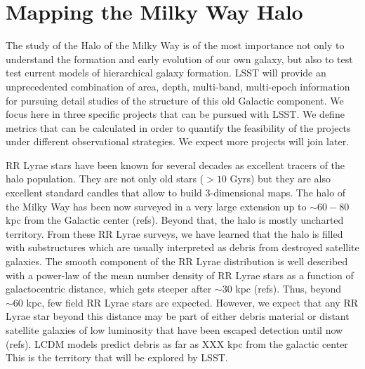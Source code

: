 %
%
%
%
%
%
%

\section{Mapping the Milky Way Halo}
\def\secname{MW_Halo}\label{sec:\secname} %


The study of the Halo of the Milky Way is of the most importance not only to understand
the formation and early evolution of our own galaxy, but also to test 
test current models of hierarchical galaxy formation. 
LSST will provide an unprecedented combination of
area, depth, multi-band, multi-epoch information for pursuing detail studies
of the structure of this old Galactic component. We focus here in three
specific projects that can be pursued with LSST. We define metrics that can
be calculated in order to quantify the feasibility of the projects under different
observational strategies. We expect more projects will join later.

RR Lyrae stars have been known for several decades as excellent tracers
of the halo population. They are not only old stars ($>10$ Gyrs) but they are
also excellent standard candles that allow to build 3-dimensional maps. 
The halo of the Milky Way has been now surveyed in a very large extension up to 
$\sim 60-80$ kpc from the Galactic center (refs). Beyond that, the halo is
mostly uncharted territory.
From these RR Lyrae surveys, we have learned that the halo is filled with substructures
which are usually interpreted as debris from destroyed satellite galaxies. The smooth 
component of the RR Lyrae distribution is well described
with a power-law of the mean number density of RR Lyrae stars as a function of
galactocentric distance, which gets steeper after $\sim 30$ kpc (refs). 
Thus, beyond $\sim 60$ kpc, few field RR Lyrae stars are expected. However, we expect that 
any RR Lyrae star beyond this distance may be part of either debris material or distant
satellite galaxies of low luminosity that have been escaped detection until now (refs). 
LCDM models predict debris as far as XXX kpc from the galactic center
This is the territory that will be explored by LSST.

